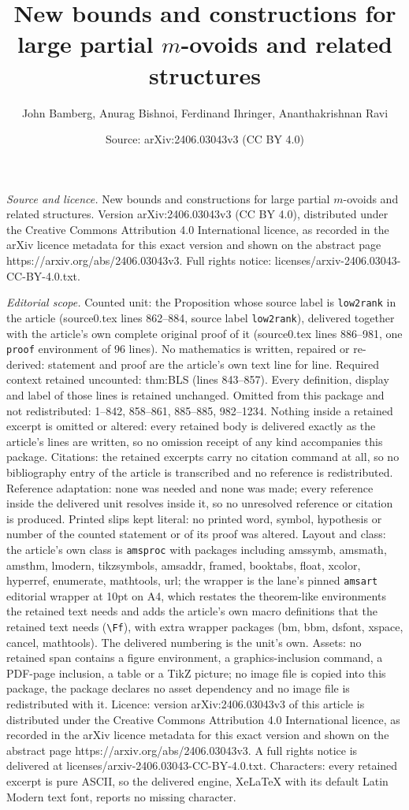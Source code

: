 \documentclass[10pt,a4paper]{amsart}
\title[New bounds and constructions for large partial $m$-ovoids an]{New bounds and constructions for large partial $m$-ovoids and related structures}
\author{John Bamberg, Anurag Bishnoi, Ferdinand Ihringer, Ananthakrishnan Ravi}
\date{Source: arXiv:2406.03043v3 (CC BY 4.0)}
\begin{document}
\maketitle

\noindent\emph{Source and licence.} New bounds and constructions for large partial $m$-ovoids and related structures. Version arXiv:2406.03043v3 (CC BY 4.0), distributed under the Creative Commons Attribution 4.0 International licence, as recorded in the arXiv licence metadata for this exact version and shown on the abstract page https://arxiv.org/abs/2406.03043v3. Full rights notice: licenses/arxiv-2406.03043-CC-BY-4.0.txt.\par\smallskip

\noindent\textit{Editorial scope.} Counted unit: the Proposition whose source label is \texttt{low2rank} in the article (source0.tex lines 862--884, source label \texttt{low2rank}), delivered together with the article's own complete original proof of it (source0.tex lines 886--981, one \texttt{proof} environment of 96 lines). No mathematics is written, repaired or re-derived: statement and proof are the article's own text line for line. Required context retained uncounted: thm:BLS (lines 843--857). Every definition, display and label of those lines is retained unchanged. Omitted from this package and not redistributed: 1--842, 858--861, 885--885, 982--1234. Nothing inside a retained excerpt is omitted or altered: every retained body is delivered exactly as the article's lines are written, so no omission receipt of any kind accompanies this package. Citations: the retained excerpts carry no citation command at all, so no bibliography entry of the article is transcribed and no reference is redistributed. Reference adaptation: none was needed and none was made; every reference inside the delivered unit resolves inside it, so no unresolved reference or citation is produced. Printed slips kept literal: no printed word, symbol, hypothesis or number of the counted statement or of its proof was altered. Layout and class: the article's own class is \texttt{amsproc} with packages including amssymb, amsmath, amsthm, lmodern, tikzsymbols, amsaddr, framed, booktabs, float, xcolor, hyperref, enumerate, mathtools, url; the wrapper is the lane's pinned \texttt{amsart} editorial wrapper at 10pt on A4, which restates the theorem-like environments the retained text needs and adds the article's own macro definitions that the retained text needs (\texttt{\textbackslash Ff}), with extra wrapper packages (bm, bbm, dsfont, xspace, cancel, mathtools). The delivered numbering is the unit's own. Assets: no retained span contains a figure environment, a graphics-inclusion command, a PDF-page inclusion, a table or a TikZ picture; no image file is copied into this package, the package declares no asset dependency and no image file is redistributed with it. Licence: version arXiv:2406.03043v3 of this article is distributed under the Creative Commons Attribution 4.0 International licence, as recorded in the arXiv licence metadata for this exact version and shown on the abstract page https://arxiv.org/abs/2406.03043v3. A full rights notice is delivered at licenses/arxiv-2406.03043-CC-BY-4.0.txt. Characters: every retained excerpt is pure ASCII, so the delivered engine, XeLaTeX with its default Latin Modern text font, reports no missing character.
\end{document}

